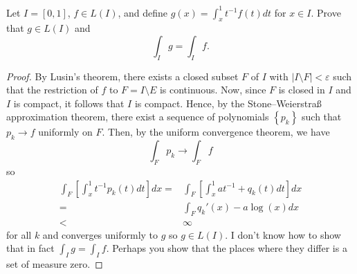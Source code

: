 \begin{problem}
Let $I=[0,1]$, $f\in L(I)$, and define $g(x)=\int_x^1
t^{-1}f(t) d  t$ for $x\in I$. Prove that $g\in L(I)$ and
\[
\int_I g=\int_I f.
\]
\end{problem}
\begin{proof}
By Lusin's theorem, there exists a closed subset $F$ of $I$ with $|I\setminus
F|<\varepsilon$ such that the restriction of $f$ to $F= I\setminus E$
is continuous. Now, since $F$ is closed in $I$ and $I$ is compact, it
follows that $I$ is compact. Hence, by the Stone--Weierstraß approximation
theorem, there exist a sequence of polynomials $\left\{ p_k \right\}$ such
that $p_k\to f$ uniformly on $F$. Then, by the uniform convergence theorem,
we have
\begin{equation}
  \label{eq:uniform-convergence-2-4}
\int_F p_k\longrightarrow \int_F f
\end{equation}
so
\begin{equation}
  \label{eq:uniform-convergence-2-2-4}
\begin{aligned}
\int_F\left[\int_x^1t^{-1}p_k(t) d  t\right] d  x
={}&\int_F\left[\int_x^1 at^{-1}+q_k(t) d  t\right] d  x\\
={}&\int_F q_k'(x)-a\log(x) d  x\\
<{}&\infty
\end{aligned}
\end{equation}
for all $k$ and converges uniformly to $g$ so $g\in L(I)$. I don't know
how to show that in fact $\int_I g=\int_I f$. Perhaps you show that the
places where they differ is a set of measure zero.
\end{proof}

